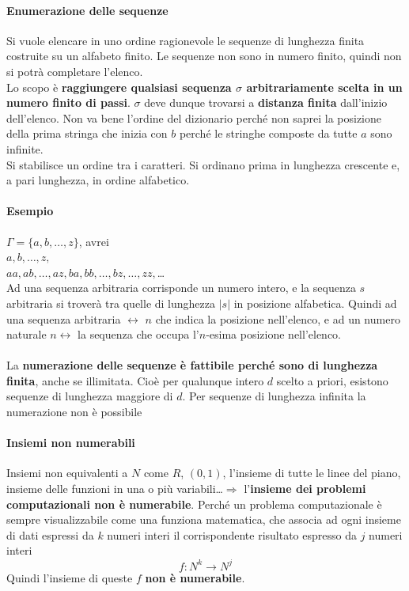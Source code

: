 \documentclass[10pt]{book}
\begin{document}
\paragraph{Enumerazione delle sequenze} Si vuole elencare in uno ordine ragionevole le sequenze di lunghezza finita costruite su un alfabeto finito. Le sequenze non sono in numero finito, quindi non si potrà completare l'elenco.\\
Lo scopo è \textbf{raggiungere qualsiasi sequenza $\sigma$ arbitrariamente scelta in un numero finito di passi}. $\sigma$ deve dunque trovarsi a \textbf{distanza finita} dall'inizio dell'elenco. Non va bene l'ordine del dizionario perché non saprei la posizione della prima stringa che inizia con $b$ perché le stringhe composte da tutte $a$ sono infinite.\\
Si stabilisce un ordine tra i caratteri. Si ordinano prima in lunghezza crescente e, a pari lunghezza, in ordine alfabetico.
\paragraph{Esempio} $\Gamma = \{a, b, \ldots, z\}$, avrei\\
$a, b, \ldots, z,$\\
$aa, ab, \ldots, az, ba, bb, \ldots, bz, \ldots, zz,$\ldots\\
Ad una sequenza arbitraria corrisponde un numero intero, e la sequenza $s$ arbitraria si troverà tra quelle di lunghezza $|s|$ in posizione alfabetica. Quindi ad una sequenza arbitraria $\leftrightarrow$ $n$ che indica la posizione nell'elenco, e ad un numero naturale $n \leftrightarrow$ la sequenza che occupa l'$n$-esima posizione nell'elenco.\\\\
La \textbf{numerazione delle sequenze è fattibile perché sono di lunghezza finita}, anche se illimitata. Cioè per qualunque intero $d$ scelto a priori, esistono sequenze di lunghezza maggiore di $d$. Per sequenze di lunghezza infinita la numerazione non è possibile
\paragraph{Insiemi non numerabili} Insiemi non equivalenti a $N$ come $R$, $(0, 1)$, l'insieme di tutte le linee del piano, insieme delle funzioni in una o più variabili\ldots $\Rightarrow$ l'\textbf{insieme dei problemi computazionali non è numerabile}. Perché un problema computazionale è sempre visualizzabile come una funziona matematica, che associa ad ogni insieme di dati espressi da $k$ numeri interi il corrispondente risultato espresso da $j$ numeri interi $$f:N^k \rightarrow N^j$$
Quindi l'insieme di queste $f$ \textbf{non è numerabile}.
\end{document}

